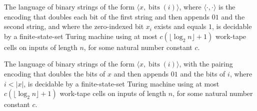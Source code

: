 \begin{theorem}
\label{Complexity.inputBitLang_mem}
\leanok
{}
The language of binary strings of the form $\langle x,\operatorname{bits}(i)\rangle$,
where $\langle\cdot,\cdot\rangle$ is the encoding that doubles each bit of the first
string and then appends $01$ and the second string, and where the zero-indexed bit $x_i$
exists and equals $1$, is decidable by a finite-state-set Turing machine using at most
$c(\lfloor\log_2 n\rfloor+1)$ work-tape cells on inputs of length $n$, for some natural
number constant $c$.
\end{theorem}

\begin{theorem}
\label{Complexity.inputLenLang_mem}
\leanok
{}
The language of binary strings of the form $\langle x,\operatorname{bits}(i)\rangle$,
with the pairing encoding that doubles the bits of $x$ and then appends $01$ and the
bits of $i$, where $i<|x|$, is decidable by a finite-state-set Turing machine using at
most $c(\lfloor\log_2 n\rfloor+1)$ work-tape cells on inputs of length $n$, for some
natural number constant $c$.
\end{theorem}
